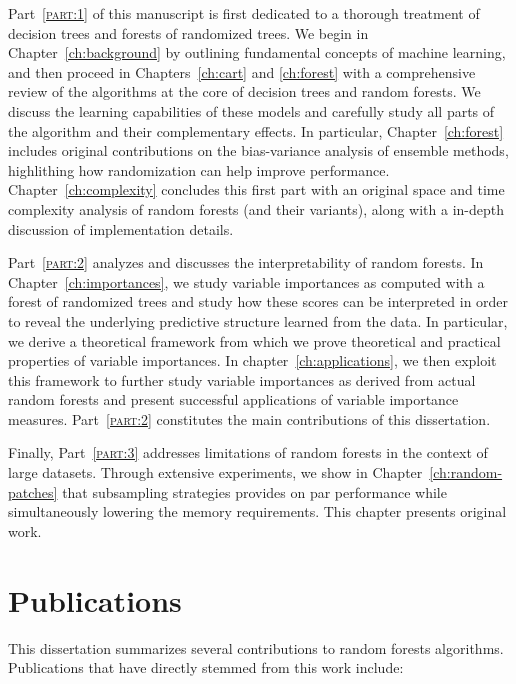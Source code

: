 Part~\textsc{\ref{part:1}} of this manuscript is first dedicated to a thorough
treatment of decision trees and forests of randomized trees. We begin in
Chapter~\ref{ch:background} by outlining fundamental concepts of machine
learning, and then proceed in Chapters~\ref{ch:cart} and \ref{ch:forest} with a
comprehensive review of the algorithms at the core of decision trees and random
forests. We discuss the learning capabilities of these models and carefully
study all parts of the algorithm and their complementary effects. In particular,
Chapter~\ref{ch:forest} includes original contributions on the bias-variance
analysis of ensemble methods, highlithing how randomization can help improve
performance. Chapter~\ref{ch:complexity} concludes this first part with an
original space and time complexity analysis of random forests (and their
variants), along with a in-depth discussion of implementation details.

Part~\textsc{\ref{part:2}} analyzes and discusses the interpretability of
random forests. In Chapter~\ref{ch:importances}, we study variable importances
as computed with a forest of randomized trees and study how these scores can be
interpreted in order to reveal the underlying predictive structure learned from
the data. In particular, we derive a theoretical framework from which we prove
theoretical and practical properties of variable importances. In
chapter~\ref{ch:applications}, we then exploit this framework to further study
variable importances as derived from actual random forests and present
successful applications of variable importance measures.
Part~\textsc{\ref{part:2}} constitutes the main contributions of this
dissertation.

Finally, Part~\textsc{\ref{part:3}} addresses limitations of random forests in
the context of large datasets. Through extensive experiments, we show in
Chapter~\ref{ch:random-patches} that subsampling strategies provides on par
performance while simultaneously lowering the memory requirements. This
chapter presents original work.

\section{Publications}

This dissertation summarizes several contributions to random forests
algorithms. Publications that have directly stemmed from this work include:


